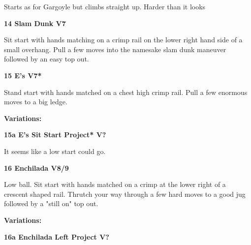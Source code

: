 \begin{multicols}{2}
\begin{adjustwidth}{0.5cm}{}
					\begin{adjustwidth}{0.5cm}{}				
					Starts as for Gargoyle but climbs straight up. Harder than it looks
					\end{adjustwidth}
				\end{adjustwidth}

			\label{rt:Slam Dunk}
\colorbox{Goldenrod!50}{
\parbox{0.95\linewidth}{
\textbf{
14 Slam Dunk V7  
}
}
}

			\begin{adjustwidth}{0.5cm}{}				
			Sit start with hands matching on a crimp rail on the lower right hand side of a small overhang. Pull a few moves into the namesake slam dunk maneuver followed by an easy top out.
			\end{adjustwidth}
			\label{rt:E's}
\colorbox{Goldenrod!50}{
\parbox{0.95\linewidth}{
\textbf{
15 E's V7*  
}
}
}

			\begin{adjustwidth}{0.5cm}{}				
			Stand start with hands matched on a chest high crimp rail. Pull a few enormous moves to a big ledge.
			\end{adjustwidth}
				\begin{adjustwidth}{0.5cm}{}				
				\textbf{Variations:} \newline
					\label{vr:E's Sit Start Project}
\colorbox{black!20}{
\parbox{0.95\linewidth}{
\textbf{
15a E's Sit Start Project* V?  
}
}
}

					\begin{adjustwidth}{0.5cm}{}				
					It seems like a low start could go.
					\end{adjustwidth}
				\end{adjustwidth}

			\label{rt:Enchilada}
\colorbox{Goldenrod!50}{
\parbox{0.95\linewidth}{
\textbf{
16 Enchilada V8/9  
}
}
}

			\begin{adjustwidth}{0.5cm}{}				
			Low ball. Sit start with hands matched on a crimp at the lower right of a crescent shaped rail. Thrutch your way through a few hard moves to a good jug followed by a "still on" top out.
			\end{adjustwidth}
				\begin{adjustwidth}{0.5cm}{}				
				\textbf{Variations:} \newline
					\label{vr:Enchilada Left Project}
\colorbox{black!20}{
\parbox{0.95\linewidth}{
\textbf{
16a Enchilada Left Project V?  
}
}
}


\end{adjustwidth}
\end{multicols}
